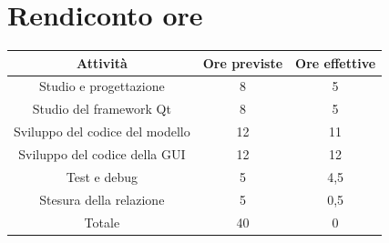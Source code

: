 \documentclass[10pt]{article}
\begin{document}
\section{Rendiconto ore}

\begin{center}
    \begin{tabular}{| c | c | c |} \hline
    Attività & Ore previste & Ore effettive \\\hline
    Studio e progettazione & 8 & 5 \\
    Studio del framework Qt & 8 & 5 \\
    Sviluppo del codice del modello & 12 & 11 \\
    Sviluppo del codice della GUI & 12 & 12 \\
    Test e debug & 5 & 4,5 \\
    Stesura della relazione & 5 & 0,5 \\\hline
    Totale & 40 & 0 \\\hline
    \end{tabular}
\end{center}
\end{document}
